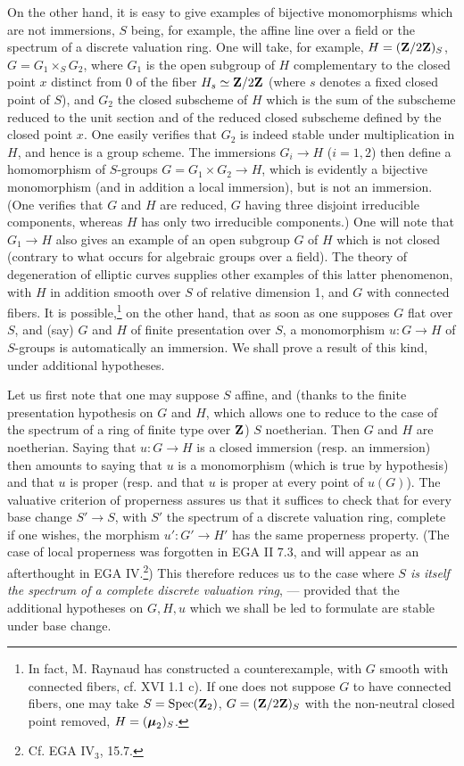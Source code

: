 On the other hand, it is easy to give examples of bijective monomorphisms which are not immersions, $S$ being, for example, the affine line over a field or the spectrum of a discrete valuation ring. One will take, for example, $H=(\mathbf{Z}/2\mathbf{Z})_S$, $G=G_1\times_S G_2$, where $G_1$ is the open subgroup of $H$ complementary to the closed point $x$ distinct from 0 of the fiber $H_s\simeq\mathbf{Z}/2\mathbf{Z}$ (where $s$ denotes a fixed closed point of $S$), and $G_2$ the closed subscheme of $H$ which is the sum of the subscheme reduced to the unit section and of the reduced closed subscheme defined by the closed point $x$. One easily verifies that $G_2$ is indeed stable under multiplication in $H$, and hence is a group scheme. The immersions $G_i\to H$ ($i=1,2$) then define a homomorphism of $S$-groups $G=G_1\times G_2\to H$, which is evidently a bijective monomorphism (and in addition a local immersion), but is not an immersion. (One verifies that $G$ and $H$ are reduced, $G$ having three disjoint irreducible components, whereas $H$ has only two irreducible components.) One will note that $G_1\to H$ also gives an example of an open subgroup $G$ of $H$ which is not closed (contrary to what occurs for algebraic groups over a field). The theory of degeneration of elliptic curves supplies other examples of this latter phenomenon, with $H$ in addition smooth over $S$ of relative dimension 1, and $G$ with connected fibers.
It is possible,\footnote{In fact, M. Raynaud has constructed a counterexample, with $G$ smooth with connected fibers, cf. XVI 1.1 c). If one does not suppose $G$ to have connected fibers, one may take $S=\operatorname{Spec}(\mathbf{Z}_2)$, $G=(\mathbf{Z}/2\mathbf{Z})_S$ with the non-neutral closed point removed, $H=(\boldsymbol{\mu}_2)_S$.} on the other hand, that as soon as one supposes $G$ flat over $S$, and (say) $G$ and $H$ of finite presentation over $S$, a monomorphism $u:G\to H$ of $S$-groups is automatically an immersion. We shall prove a result of this kind, under additional hypotheses.

Let us first note that one may suppose $S$ affine, and (thanks to the finite presentation hypothesis on $G$ and $H$, which allows one to reduce to the case of the spectrum of a ring of finite type over $\mathbf{Z}$) $S$ noetherian. Then $G$ and $H$ are noetherian. Saying that $u:G\to H$ is a closed immersion (resp. an immersion) then amounts to saying that $u$ is a monomorphism (which is true by hypothesis) and that $u$ is proper (resp. and that $u$ is proper at every point of $u(G)$). The valuative criterion of properness assures us that it suffices to check that for every base change $S'\to S$, with $S'$ the spectrum of a discrete valuation ring, complete if one wishes, the morphism $u':G'\to H'$ has the same properness property. (The case of local properness was forgotten in EGA II 7.3, and will appear as an afterthought in EGA IV.\footnote{Cf. EGA IV$_3$, 15.7.}) This therefore reduces us to the case where \emph{$S$ is itself the spectrum of a complete discrete valuation ring}, --- provided that the additional hypotheses on $G,H,u$ which we shall be led to formulate are stable under base change.

